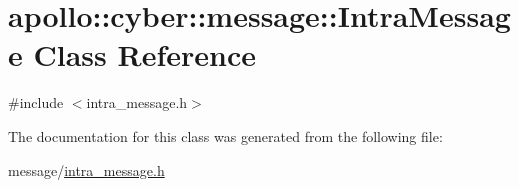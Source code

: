 \hypertarget{classapollo_1_1cyber_1_1message_1_1IntraMessage}{\section{apollo\-:\-:cyber\-:\-:message\-:\-:Intra\-Message Class Reference}
\label{classapollo_1_1cyber_1_1message_1_1IntraMessage}
}


{\ttfamily \#include $<$intra\-\_\-message.\-h$>$}



The documentation for this class was generated from the following file\-:\begin{DoxyCompactItemize}
\item 
message/\hyperlink{intra__message_8h}{intra\-\_\-message.\-h}\end{DoxyCompactItemize}

